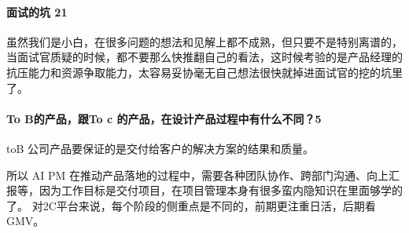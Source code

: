 \documentclass[letterpaper,11pt,english]{sphinxmanual}
\begin{document}
\paragraph{面试的坑 21\sphinxfootnotemark[801]}
\label{\detokenize{chapter_interview/question:id16}}%
\begin{footnotetext}[801]\sphinxAtStartFootnote
{}
%
\end{footnotetext}\ignorespaces 
虽然我们是小白，在很多问题的想法和见解上都不成熟，但只要不是特别离谱的，当面试官质疑的时候，都不要那么快推翻自己的看法，这时候考验的是产品经理的抗压能力和资源争取能力，太容易妥协毫无自己想法很快就掉进面试官的挖的坑里了。


\paragraph{To B的产品，跟To c 的产品，在设计产品过程中有什么不同？5\sphinxfootnotemark[802]}
\label{\detokenize{chapter_interview/question:to-b-to-c-5}}%
\begin{footnotetext}[802]\sphinxAtStartFootnote
{}
%
\end{footnotetext}\ignorespaces 
toB
公司产品要保证的是交付给客户的解决方案的结果和质量。%
\begin{footnote}[803]\sphinxAtStartFootnote
{}
%
\end{footnote}所以
AI PM
在推动产品落地的过程中，需要各种团队协作、跨部门沟通、向上汇报等，因为工作目标是交付项目，在项目管理本身有很多蛮内隐知识在里面够学的了。
对2C平台来说，每个阶段的侧重点是不同的，前期更注重日活，后期看GMV。%
\begin{footnote}[804]\sphinxAtStartFootnote
{}
%
\end{footnote}
\end{document}
